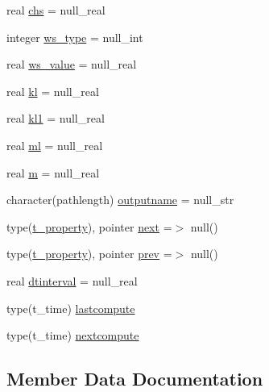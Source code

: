 \begin{DoxyCompactItemize}
\item 
real \mbox{\hyperlink{structmodulereservoirs_1_1t__property_a7e351a21ab680214b3c50bd77c7f518b}{chs}} = null\+\_\+real
\item 
integer \mbox{\hyperlink{structmodulereservoirs_1_1t__property_aa69d75ae61b3b2745783082af98b4809}{ws\+\_\+type}} = null\+\_\+int
\item 
real \mbox{\hyperlink{structmodulereservoirs_1_1t__property_af4bfc6b6311ccd6fd0be9b43d0f97292}{ws\+\_\+value}} = null\+\_\+real
\item 
real \mbox{\hyperlink{structmodulereservoirs_1_1t__property_a563d81ae7b640bd4bfece6c44052ebfb}{kl}} = null\+\_\+real
\item 
real \mbox{\hyperlink{structmodulereservoirs_1_1t__property_a263a7f97eb04941a3711b5a193982e6f}{kl1}} = null\+\_\+real
\item 
real \mbox{\hyperlink{structmodulereservoirs_1_1t__property_a9326b8369853730eeea9760644f2d306}{ml}} = null\+\_\+real
\item 
real \mbox{\hyperlink{structmodulereservoirs_1_1t__property_af7f487cb35adc2dc8698f696cdaec2b7}{m}} = null\+\_\+real
\item 
character(pathlength) \mbox{\hyperlink{structmodulereservoirs_1_1t__property_afbfbf8a1de18174bfb6e721ca76064f0}{outputname}} = null\+\_\+str
\item 
type(\mbox{\hyperlink{structmodulereservoirs_1_1t__property}{t\+\_\+property}}), pointer \mbox{\hyperlink{structmodulereservoirs_1_1t__property_aec857b6936cc823ab322a90e662e4631}{next}} =$>$ null()
\item 
type(\mbox{\hyperlink{structmodulereservoirs_1_1t__property}{t\+\_\+property}}), pointer \mbox{\hyperlink{structmodulereservoirs_1_1t__property_a8283a037ba0857dd43bee86fbdb5d647}{prev}} =$>$ null()
\item 
real \mbox{\hyperlink{structmodulereservoirs_1_1t__property_af5b1b850b0d2d719923a70a7a3a20314}{dtinterval}} = null\+\_\+real
\item 
type(t\+\_\+time) \mbox{\hyperlink{structmodulereservoirs_1_1t__property_a3432791bba0fd50de1d1d8bfc8ab7f61}{lastcompute}}
\item 
type(t\+\_\+time) \mbox{\hyperlink{structmodulereservoirs_1_1t__property_aaa9aa0d314686c8f41e932a1002f0957}{nextcompute}}
\end{DoxyCompactItemize}


\subsection{Member Data Documentation}
\mbox{\label{structmodulereservoirs_1_1t__property_ae59e46173a3ed69ad5a25232c01aa812}} 
